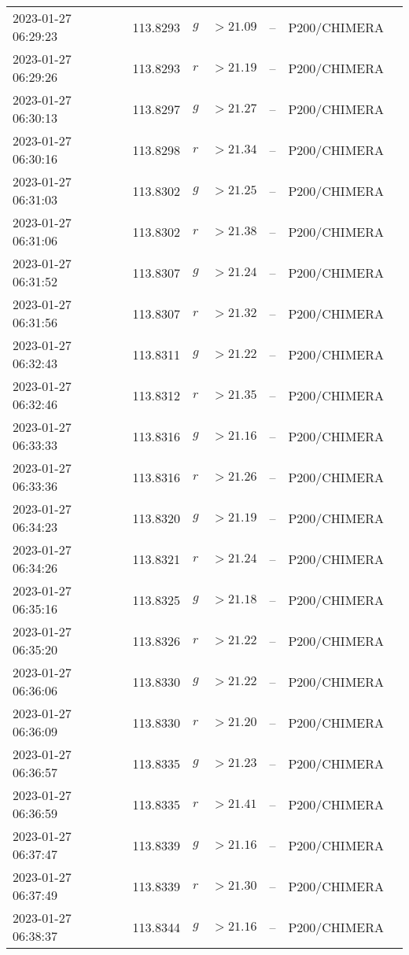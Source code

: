 \documentclass{nature_plusfigure}
\begin{document}
\begin{supplement}
\begin{center}
\begin{longtable}{lllllll}
2023-01-27 06:29:23 & 113.8293 & $g$ & $>21.09$ & -- & P200/CHIMERA &  \\ 
2023-01-27 06:29:26 & 113.8293 & $r$ & $>21.19$ & -- & P200/CHIMERA &  \\ 
2023-01-27 06:30:13 & 113.8297 & $g$ & $>21.27$ & -- & P200/CHIMERA &  \\ 
2023-01-27 06:30:16 & 113.8298 & $r$ & $>21.34$ & -- & P200/CHIMERA &  \\ 
2023-01-27 06:31:03 & 113.8302 & $g$ & $>21.25$ & -- & P200/CHIMERA &  \\ 
2023-01-27 06:31:06 & 113.8302 & $r$ & $>21.38$ & -- & P200/CHIMERA &  \\ 
2023-01-27 06:31:52 & 113.8307 & $g$ & $>21.24$ & -- & P200/CHIMERA &  \\ 
2023-01-27 06:31:56 & 113.8307 & $r$ & $>21.32$ & -- & P200/CHIMERA &  \\ 
2023-01-27 06:32:43 & 113.8311 & $g$ & $>21.22$ & -- & P200/CHIMERA &  \\ 
2023-01-27 06:32:46 & 113.8312 & $r$ & $>21.35$ & -- & P200/CHIMERA &  \\ 
2023-01-27 06:33:33 & 113.8316 & $g$ & $>21.16$ & -- & P200/CHIMERA &  \\ 
2023-01-27 06:33:36 & 113.8316 & $r$ & $>21.26$ & -- & P200/CHIMERA &  \\ 
2023-01-27 06:34:23 & 113.8320 & $g$ & $>21.19$ & -- & P200/CHIMERA &  \\ 
2023-01-27 06:34:26 & 113.8321 & $r$ & $>21.24$ & -- & P200/CHIMERA &  \\ 
2023-01-27 06:35:16 & 113.8325 & $g$ & $>21.18$ & -- & P200/CHIMERA &  \\ 
2023-01-27 06:35:20 & 113.8326 & $r$ & $>21.22$ & -- & P200/CHIMERA &  \\ 
2023-01-27 06:36:06 & 113.8330 & $g$ & $>21.22$ & -- & P200/CHIMERA &  \\ 
2023-01-27 06:36:09 & 113.8330 & $r$ & $>21.20$ & -- & P200/CHIMERA &  \\ 
2023-01-27 06:36:57 & 113.8335 & $g$ & $>21.23$ & -- & P200/CHIMERA &  \\ 
2023-01-27 06:36:59 & 113.8335 & $r$ & $>21.41$ & -- & P200/CHIMERA &  \\ 
2023-01-27 06:37:47 & 113.8339 & $g$ & $>21.16$ & -- & P200/CHIMERA &  \\ 
2023-01-27 06:37:49 & 113.8339 & $r$ & $>21.30$ & -- & P200/CHIMERA &  \\ 
2023-01-27 06:38:37 & 113.8344 & $g$ & $>21.16$ & -- & P200/CHIMERA &  \\ 

\end{longtable}
\end{center}
\end{supplement}
\end{document}
